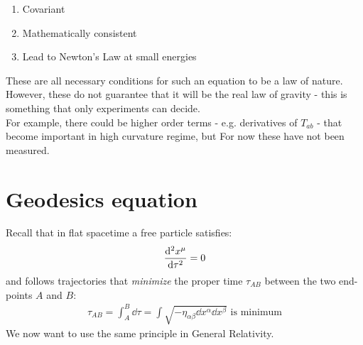 \documentclass[../template.tex]{subfiles}
\begin{document}
\begin{enumerate}
    \item Covariant
    \item Mathematically consistent
    \item Lead to Newton's Law at small energies
\end{enumerate}
These are all necessary conditions for such an equation to be a law of nature. However, these do not guarantee that it will be the real law of gravity - this is something that only experiments can decide.\\
For example, there could be higher order terms - e.g. derivatives of $T_{ab}$ - that become important in high curvature regime, but For now these have not been measured. 
  

\section{Geodesics equation}
Recall that in flat spacetime a free particle satisfies:
\begin{align*}
    \dv[2]{x^\mu}{\tau} = 0
\end{align*}
and follows trajectories that \textit{minimize} the proper time $\tau_{AB}$ between the two end-points $A$ and $B$:
\begin{align*}
    \tau_{AB} = \int_A^B \dd{\tau} = \int \sqrt{- \eta_{\alpha \beta} \dd{x^\alpha} \dd{x^\beta}} \text{ is minimum}
\end{align*}    
We now want to use the same principle in General Relativity.\\
\end{document}
